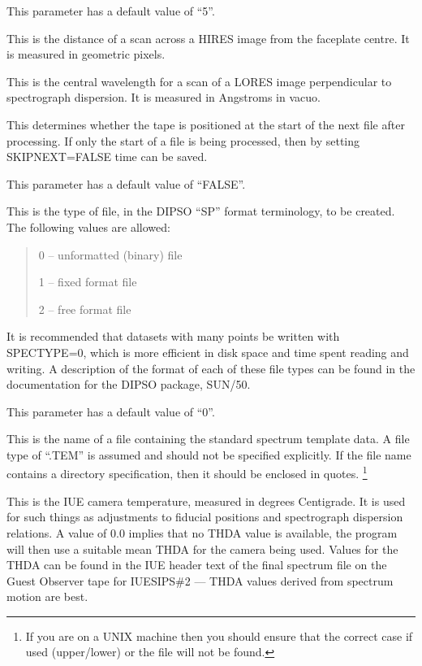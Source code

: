 \begin {description}
This parameter has a default value of ``5''.

\item [SCANDIST=number]
This is the distance of a scan across a HIRES image from the faceplate
centre.
It is measured in geometric pixels.

\item [SCANWV=number]
This is the central wavelength for a scan of a LORES image
perpendicular to spectrograph dispersion.
It is measured in Angstroms in vacuo.

\item [SKIPNEXT=boolean]
This determines whether the tape is positioned at the start of the
next file after processing.
If only the start of a file is being processed, then by setting
SKIPNEXT=FALSE time can be saved.

This parameter has a default value of ``FALSE''.

\item [SPECTYPE=number]
This is the type of file, in the DIPSO ``SP'' format terminology, to be
created. The following values are allowed: 

\begin {quote}
\begin {description}
\item 0 -- unformatted (binary) file
\item 1 -- fixed format file
\item 2 -- free format file
\end {description}
\end {quote}

It is recommended that datasets with many points be written with
SPECTYPE=0, which is more efficient in disk space and time spent
reading and writing.
A description of the format of each of these file types can be found
in the documentation for the DIPSO package, SUN/50.

This parameter has a default value of ``0''.

\item [TEMFILE=string]
This is the name of a file containing the standard spectrum template
data.
A  file type of ``.TEM'' is assumed and should not be specified
explicitly.
If the file name contains a directory specification, then it should be
enclosed in quotes.
\footnote{If you are on a UNIX machine then you should ensure that the
correct case if used (upper/lower) or the file will not be found.}

\item [THDA=number]
This is the IUE camera temperature, measured in degrees Centigrade.
It is used for such things as adjustments to fiducial positions
and spectrograph dispersion relations.
A value of 0.0 implies that no THDA value is available, the program
will then  use a suitable mean THDA for the camera being used.
Values for the THDA can be found in the IUE header text of the final
spectrum file on the Guest Observer tape for IUESIPS\#2 ---
THDA values derived from spectrum motion are best.


\end{description}

